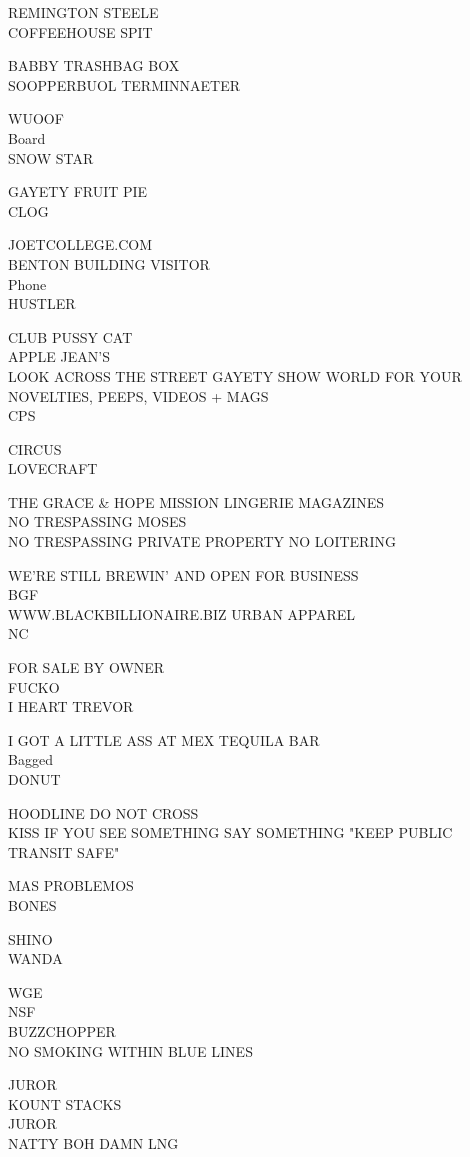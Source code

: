 \documentclass[10pt,letterpaper]{article}
\begin{document}
REMINGTON STEELE\\
COFFEEHOUSE SPIT

BABBY TRASHBAG BOX\\
SOOPPERBUOL TERMINNAETER

WUOOF\\
Board\\
SNOW STAR

GAYETY FRUIT PIE\\
CLOG

JOETCOLLEGE.COM\\
BENTON BUILDING VISITOR\\
Phone\\
HUSTLER

CLUB PUSSY CAT\\
APPLE JEAN'S\\
LOOK ACROSS THE STREET GAYETY SHOW WORLD FOR YOUR NOVELTIES, PEEPS, VIDEOS + MAGS\\
CPS

CIRCUS\\
LOVECRAFT

THE GRACE \& HOPE MISSION LINGERIE MAGAZINES\\
NO TRESPASSING MOSES\\
NO TRESPASSING PRIVATE PROPERTY NO LOITERING

WE'RE STILL BREWIN' AND OPEN FOR BUSINESS\\
BGF\\
WWW.BLACKBILLIONAIRE.BIZ URBAN APPAREL\\
NC

FOR SALE BY OWNER\\
FUCKO\\
I HEART TREVOR

I GOT A LITTLE ASS AT MEX TEQUILA BAR\\
Bagged\\
DONUT

HOODLINE DO NOT CROSS\\
KISS IF YOU SEE SOMETHING SAY SOMETHING "KEEP PUBLIC TRANSIT SAFE"

MAS PROBLEMOS\\
BONES

SHINO\\
WANDA

WGE\\
NSF\\
BUZZCHOPPER\\
NO SMOKING WITHIN BLUE LINES

JUROR\\
KOUNT STACKS\\
JUROR\\
NATTY BOH DAMN LNG
\end{document}
